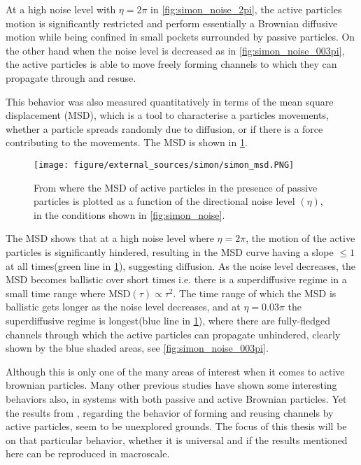 At a high noise level with $\eta=2\pi$ in \cref{fig:simon_noise_2pi}, the active particles motion is significantly 
restricted and perform essentially a Brownian diffusive motion while being confined in small pockets surrounded by passive particles. 
On the other hand when the noise level is decreased as in \cref{fig:simon_noise_003pi}, the active particles is 
able to move freely forming channels to which they can propagate through and resuse.

This behavior was also measured quantitatively in terms of the mean square displacement (MSD), which 
is a tool to characterise a particles movements, whether a particle spreads randomly due to diffusion, or 
if there is a force contributing to the movements. The MSD is shown in \cref{fig:simon_msd}.

\begin{figure}[htp]
    \centering
    \texttt{[image: figure/external\_sources/simon/simon\_msd.PNG]}
    \caption{From \cite{nilsson2017metastable} where the MSD 
    of active particles in the presence of passive particles is plotted as a function of the directional
    noise level $(\eta)$, in the conditions shown in \cref{fig:simon_noise}.}
    \label{fig:simon_msd}
\end{figure}

The MSD shows that at a high noise level where $\eta=2\pi$, the motion of the active particles 
is significantly hindered, resulting in the MSD curve having a slope $\leq1$ at all times(green line in \cref{fig:simon_msd}), 
suggesting diffusion. As the noise level decreases, the MSD becomes ballistic over short times i.e. there 
is a superdiffusive regime in a small time range where $\text{MSD}(\tau)\propto\tau^2$. The time range of which the MSD is ballistic gets longer 
as the noise level decreases, and at $\eta=0.03\pi$ the superdiffusive regime is longest(blue line in \cref{fig:simon_msd}), where there are fully-fledged channels 
through which the active particles can propagate unhindered, clearly shown by the blue shaded areas, see \cref{fig:simon_noise_003pi}. 

Although this is only one of the many areas of interest when it comes to active brownian particles. Many other previous 
studies have shown some interesting behaviors also, in systems with both passive and active Brownian particles. %
Yet the results from \citeauthor{nilsson2017metastable}, regarding the behavior of forming and reusing channels by active particles, 
seem to be unexplored grounds. The focus of this thesis will be on that particular behavior, whether it is universal and 
if the results mentioned here can be reproduced in macroscale.




